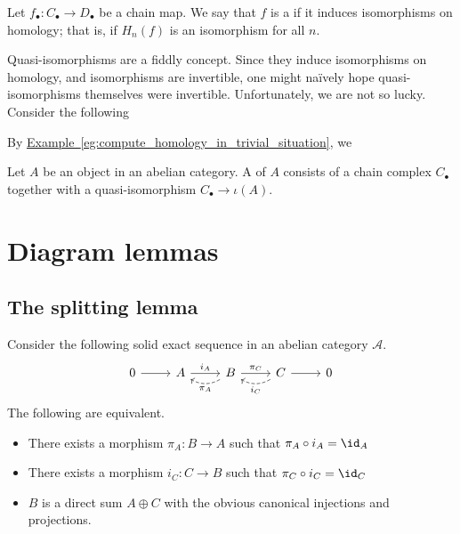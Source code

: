 \documentclass[main.tex]{subfiles}
\begin{document}
\begin{definition}
  \label{def:quasi_isomorphism}
  Let $f_{\bullet}\colon C_{\bullet} \to D_{\bullet}$ be a chain map. We say that $f$ is a  if it induces isomorphisms on homology; that is, if $H_{n}(f)$ is an isomorphism for all $n$.
\end{definition}

Quasi-isomorphisms are a fiddly concept. Since they induce isomorphisms on homology, and isomorphisms are invertible, one might naïvely hope quasi-isomorphisms themselves were invertible. Unfortunately, we are not so lucky. Consider the following

By \hyperref[eg:compute_homology_in_trivial_situation]{Example~\ref*{eg:compute_homology_in_trivial_situation}}, we

\begin{definition}[resolution]
  \label{def:resolution}
  Let $A$ be an object in an abelian category. A  of $A$ consists of a chain complex $C_{\bullet}$ together with a quasi-isomorphism $C_{\bullet} \to \iota(A)$.
\end{definition}

\section{Diagram lemmas}
\label{sec:diagram_lemmas}

\subsection{The splitting lemma}
\label{ssc:the_splitting_lemma}

\begin{lemma}
  \label{lemma:splitting_lemma}
  Consider the following solid exact sequence in an abelian category $\mathcal{A}$.
  \begin{equation*}
    \begin{tikzcd}
      0
      \arrow[r]
      & A
      \arrow[r, "i_{A}"]
      & B
      \arrow[r, "\pi_{C}"]
      \arrow[l, bend left, dashed, "\pi_{A}"]
      & C
      \arrow[r]
      \arrow[l, bend left, dashed, "i_{C}"]
      & 0
    \end{tikzcd}
  \end{equation*}
  The following are equivalent.
  \begin{itemize}
    \item There exists a morphism $\pi_{A}\colon B \to A$ such that $\pi_{A} \circ i_{A} = \id_{A}$

    \item There exists a morphism $i_{C}\colon C \to B$ such that $\pi_{C} \circ i_{C} = \id_{C}$

    \item $B$ is a direct sum $A \oplus C$ with the obvious canonical injections and projections.
  \end{itemize}
\end{lemma}
\end{document}
